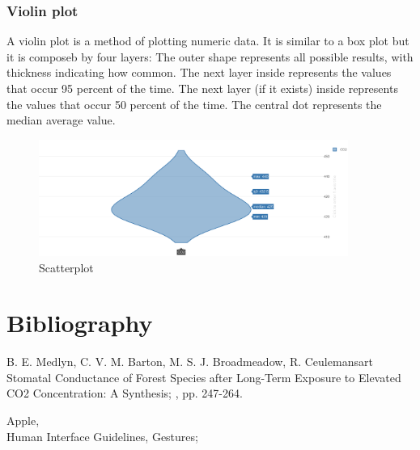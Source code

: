 \documentclass[12pt]{article} %
\begin{document}
\subsubsection{Violin plot}
A violin plot is a method of plotting numeric data. It is similar to a box plot but it is composeb by four layers: The outer shape represents all possible results, with thickness indicating how common. The next layer inside represents the values that occur 95 percent of the time. The next layer (if it exists) inside represents the values that occur 50 percent of the time. The central dot represents the median average value. 
\begin{figure}[H]
  \centering
  \includegraphics[width=0.9\textwidth]{img/violinChart.png}
  \caption{Scatterplot}
  \label{fig:scttrPlot}
\end{figure}






\newpage
\section{Bibliography}
\begin{thebibliography}{99} %

\bibitem B. E. Medlyn, C. V. M. Barton, M. S. J. Broadmeadow, R. Ceulemans{art}
Stomatal Conductance of Forest Species after Long-Term Exposure to Elevated CO2 Concentration: A Synthesis;
,  pp. 247-264.

Apple,\\ Human Interface Guidelines, Gestures; \\

 
\end{thebibliography}

\end{document}
